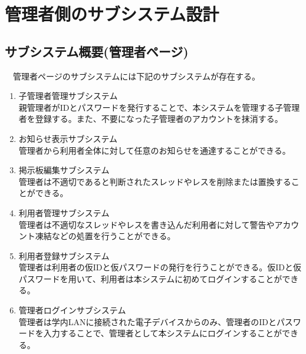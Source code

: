 \documentclass[a4j]{jarticle}
\begin{document}
\section{管理者側のサブシステム設計}

\subsection{サブシステム概要(管理者ページ)}
　管理者ページのサブシステムには下記のサブシステムが存在する。
\begin{enumerate}
  \item 子管理者管理サブシステム\\
  親管理者がIDとパスワードを発行することで、本システムを管理する子管理者を登録する。また、不要になった子管理者のアカウントを抹消する。
\\

  \item お知らせ表示サブシステム\\
  管理者から利用者全体に対して任意のお知らせを通達することができる。
\\

  \item 掲示板編集サブシステム\\
  管理者は不適切であると判断されたスレッドやレスを削除または置換することができる。
\\

  \item 利用者管理サブシステム\\
  管理者は不適切なスレッドやレスを書き込んだ利用者に対して警告やアカウント凍結などの処置を行うことができる。
\\

  \item 利用者登録サブシステム\\
  管理者は利用者の仮IDと仮パスワードの発行を行うことができる。仮IDと仮パスワードを用いて、利用者は本システムに初めてログインすることができる。
\\

  \item 管理者ログインサブシステム\\
  管理者は学内LANに接続された電子デバイスからのみ、管理者のIDとパスワードを入力することで、管理者として本システムにログインすることができる。
\end{enumerate}
\end{document}

